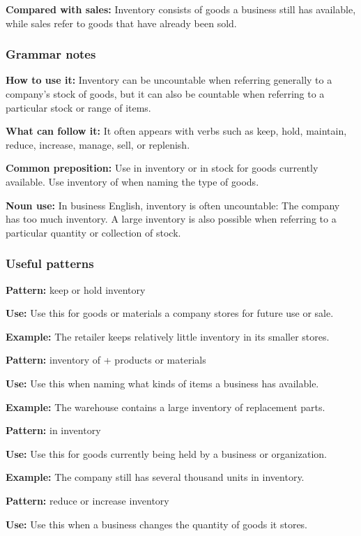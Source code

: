 \documentclass[11pt]{article}
\begin{document}
\textbf{Compared with sales:} Inventory consists of goods a business still has available, while sales refer to goods that have already been sold.

\subsubsection{Grammar notes}
\textbf{How to use it:} Inventory can be uncountable when referring generally to a company's stock of goods, but it can also be countable when referring to a particular stock or range of items.

\textbf{What can follow it:} It often appears with verbs such as keep, hold, maintain, reduce, increase, manage, sell, or replenish.

\textbf{Common preposition:} Use in inventory or in stock for goods currently available. Use inventory of when naming the type of goods.

\textbf{Noun use:} In business English, inventory is often uncountable: The company has too much inventory. A large inventory is also possible when referring to a particular quantity or collection of stock.

\subsubsection{Useful patterns}
\textbf{Pattern:} keep or hold inventory

\textbf{Use:} Use this for goods or materials a company stores for future use or sale.

\textbf{Example:} The retailer keeps relatively little inventory in its smaller stores.

\textbf{Pattern:} inventory of + products or materials

\textbf{Use:} Use this when naming what kinds of items a business has available.

\textbf{Example:} The warehouse contains a large inventory of replacement parts.

\textbf{Pattern:} in inventory

\textbf{Use:} Use this for goods currently being held by a business or organization.

\textbf{Example:} The company still has several thousand units in inventory.

\textbf{Pattern:} reduce or increase inventory

\textbf{Use:} Use this when a business changes the quantity of goods it stores.
\end{document}
